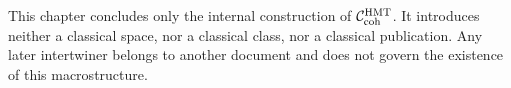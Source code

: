 \begin{warningbox}
This chapter concludes only the internal construction of
\(\mathcal C_{\rm coh}^{\rm HMT}\). It introduces neither a classical space,
nor a classical class, nor a classical publication. Any later intertwiner
belongs to another document and does not govern the existence of this
macrostructure.
\end{warningbox}
\fi

